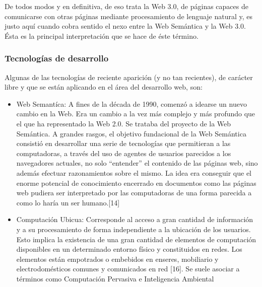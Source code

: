 De todos modos y en definitiva, de eso trata la Web 3.0, de páginas capaces de comunicarse con otras páginas 
mediante procesamiento de lenguaje natural y, es justo aquí cuando cobra sentido el nexo entre la Web Semántica 
y la Web 3.0. Ésta es la principal interpretación que se hace de éste término. 

\subsubsection{Tecnologías de desarrollo}

Algunas de las tecnologías de reciente aparición (y no tan recientes), de carácter libre y que se están aplicando en el 
área del desarrollo web, son:

\begin{itemize}
 \item Web Semantíca: A fines de la década de 1990, comenzó a idearse un nuevo cambio en la Web. Era un cambio a 
  la vez más complejo y más profundo que el que ha representado la Web 2.0. Se trataba del proyecto de la Web
  Semántica. A grandes rasgos, el objetivo fundacional de la Web Semántica consistió en desarrollar una serie de 
  tecnologías que permitieran a las computadoras, a través del uso de agentes de usuarios parecidos a los 
  navegadores actuales, no solo “entender” el contenido de las páginas web, sino además efectuar razonamientos 
  sobre el mismo. La idea era conseguir que el enorme potencial de conocimiento encerrado en documentos como 
  las páginas web pudiera ser interpretado por las computadoras de una forma parecida a como lo haría 
  un ser humano.[14]\\
  
 \item Computación Ubicua: Corresponde al acceso a gran cantidad de información y a su procesamiento de 
 forma independiente a  la ubicación de los usuarios. Esto implica la existencia de una gran cantidad de 
 elementos de computación disponibles en un determinado  entorno físico y constituidos en redes. Los elementos 
 están empotrados o embebidos en enseres, mobiliario y electrodomésticos comunes y  comunicados en red [16]. 
 Se suele asociar a términos como Computación Pervasiva e Inteligencia Ambiental

\end{itemize}
\newpage